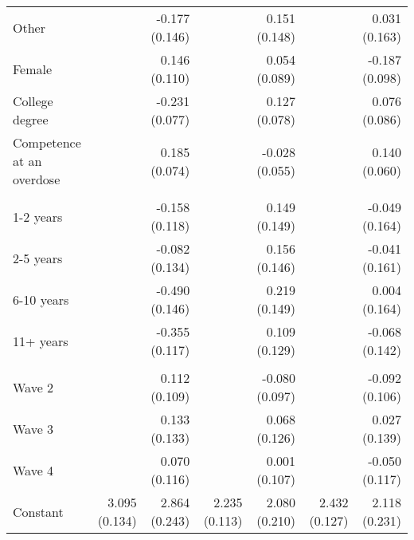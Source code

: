 \begin{table}[htbp]
\begin{adjustbox}{max width=\linewidth}
\begin{tabular}{l*{6}{D{.}{.}{-1}}}
Other           &                  &-0.177 (0.146)         &                  &0.151 (0.148)         &                  &0.031 (0.163)         \\
Female          &                  &0.146 (0.110)         &                  &0.054 (0.089)         &                  &-0.187 (0.098)         \\
College degree  &                  &-0.231\sym{**} (0.077)         &                  &0.127 (0.078)         &                  &0.076 (0.086)         \\
Competence at an overdose&                  &0.185\sym{*} (0.074)         &                  &-0.028 (0.055)         &                  &0.140\sym{*} (0.060)         \\
&                  &                  &                  &                  &                  &                  \\
1-2 years       &                  &-0.158 (0.118)         &                  &0.149 (0.149)         &                  &-0.049 (0.164)         \\
2-5 years       &                  &-0.082 (0.134)         &                  &0.156 (0.146)         &                  &-0.041 (0.161)         \\
6-10 years      &                  &-0.490\sym{***} (0.146)         &                  &0.219 (0.149)         &                  &0.004 (0.164)         \\
11+ years       &                  &-0.355\sym{**} (0.117)         &                  &0.109 (0.129)         &                  &-0.068 (0.142)         \\
      &                  &                  &                  &                  &                  &                  \\
Wave 2          &                  &0.112 (0.109)         &                  &-0.080 (0.097)         &                  &-0.092 (0.106)         \\
Wave 3          &                  &0.133 (0.133)         &                  &0.068 (0.126)         &                  &0.027 (0.139)         \\
Wave 4          &                  &0.070 (0.116)         &                  &0.001 (0.107)         &                  &-0.050 (0.117)         \\
Constant        &3.095\sym{***} (0.134)         &2.864\sym{***} (0.243)         &2.235\sym{***} (0.113)         &2.080\sym{***} (0.210)         &2.432\sym{***} (0.127)         &2.118\sym{***} (0.231)         \\

\end{tabular}
\end{adjustbox}
\end{table}
